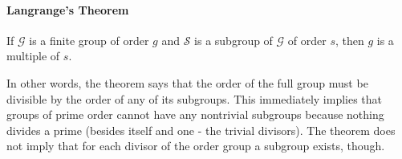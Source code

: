 





\paragraph{Langrange's Theorem} If $\mathcal{G}$ is a finite group of order $g$ and $\mathcal{S}$ is a subgroup of  $\mathcal{G}$ of order $s$, then $g$ is a multiple of $s$.

\medskip
In other words, the theorem says that the order of the full group must be divisible by the order of any of its subgroups. This immediately implies that groups of prime order cannot have any nontrivial subgroups because nothing divides a prime (besides itself and one - the trivial divisors). The theorem does not imply that for each divisor of the order group a subgroup exists, though. 



